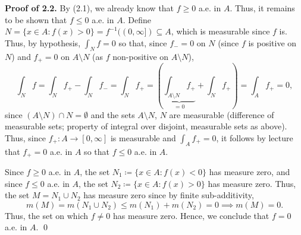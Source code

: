 \noindent \textbf{Proof of 2.2.} By (2.1), we already know that \( f \geq 0 \) a.e. in \( A \). Thus, it remains to be shown that \( f \leq 0 \) a.e. in \( A \). Define \( N = \{ x \in A : f(x) > 0 \} = f ^{-1} ((0,\infty]) \subseteq A \), which is measurable since \( f \) is. Thus, by hypothesis, \( \int_{N} f = 0 \) so that, since \( f_{-} = 0 \) on \( N \) (since \( f \) is positive on \( N \)) and \( f_{+} = 0 \) on \( A\setminus N \) (as \( f \) non-positive on \( A \setminus N \)), \[\int_{N} f = \int_{N} f_{+} - \int_{N} f_{-} = \int_{N} f_{+} = \left ( {\underbrace{\int_{A \setminus N} f_{+}}_{=0}  + \int_{N} f_{+} } \right ) = \int_{A} f_{+} = 0,\] since \( (A \setminus N) \cap N = \emptyset  \) and the sets \( A \setminus N \), \( N \) are measurable (difference of measurable sets; property of integral over disjoint, measurable sets as above). Thus, since \( f_{+} : A \to [0,\infty]  \) is measurable and \( \int_{A} f_{+} = 0  \), it follows by lecture that \( f_{+} = 0 \) a.e. in \( A \) so that \( f \leq 0 \) a.e. in \( A \).

Since \( f \geq 0 \) a.e. in \( A \), the set \( N_1 \coloneqq \{ x \in A : f(x) < 0 \}  \) has measure zero, and since \( f \leq 0 \) a.e. in \( A \), the set \( N_{2} \coloneqq \{ x \in A : f(x) > 0 \}   \) has measure zero. Thus, the set \( M = N_1 \cup N_2\) has measure zero since by finite sub-additivity, \[m(M) = m(N_1 \cup N_2) \leq m(N_1) + m(N_2) = 0 \implies m(M) = 0.\] Thus, the set on which \( f \neq 0 \) has measure zero. Hence, we conclude that \( f = 0 \) a.e. in \( A \). \qed
